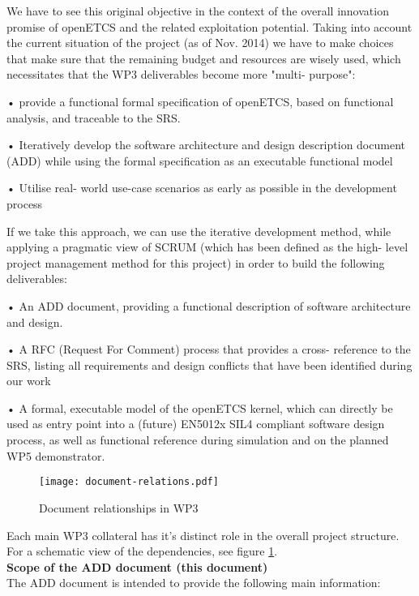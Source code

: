 We have to see this original objective in the context of the overall innovation promise of openETCS and the related exploitation potential.
Taking into account the current situation of the project (as of Nov. 2014) we have to make choices that make sure that the remaining budget and resources are wisely used, which necessitates that the WP3 deliverables become more "multi- purpose":

 •  provide a functional formal specification of openETCS, based on functional analysis, and traceable to the SRS.
 
 •  Iteratively develop the software architecture and design description document (ADD) while using the formal specification as an executable functional model
 
 •  Utilise real- world use-case scenarios as early as possible in the development process
 
If we take this approach, we can use the iterative development method, while applying a pragmatic view of SCRUM (which has been defined as the high- level project management method for this project) in order to build the following deliverables:

 •  An ADD document, providing a functional description of software architecture and design.
 
 •  A RFC (Request For Comment) process that provides a cross- reference to the SRS, listing all requirements and design conflicts that have been identified during our work
 
 •  A formal, executable model of the openETCS kernel, which can directly be used as entry point into a (future) EN5012x SIL4 compliant software design process, as well as functional reference during simulation and on the planned WP5 demonstrator.
 
 
\begin{figure}
  \centering
  \texttt{[image: document-relations.pdf]}
  \caption{Document relationships in WP3}
  \label{fig:doc-rels}
\end{figure}

Each main WP3 collateral has it's distinct role in the overall project structure. For a schematic view of the dependencies, see figure \ref{fig:doc-rels}. \\


\textbf{Scope of the ADD document (this document)}\\

 



The ADD document is intended to provide the following main information:

